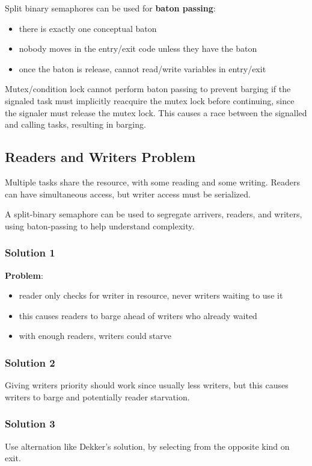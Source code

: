 \documentclass[11pt]{article}
\begin{document}
Split binary semaphores can be used for \textbf{baton passing}:
\begin{itemize}
\item there is exactly one conceptual baton
\item nobody moves in the entry/exit code unless they have the baton
\item once the baton is release, cannot read/write variables in entry/exit
\end{itemize}

Mutex/condition lock cannot perform baton passing to prevent barging if the signaled task
must implicitly reacquire the mutex lock before continuing, since the signaler must release
the mutex lock.
This causes a race between the signalled and calling tasks, resulting in barging.
\subsection{Readers and Writers Problem}
\label{sec:org2b49320}
Multiple tasks share the resource, with some reading and some writing.
Readers can have simultaneous access, but writer access must be serialized.

A split-binary semaphore can be used to segregate arrivers, readers, and writers,
using baton-passing to help understand complexity.
\subsubsection{Solution 1}
\label{sec:org819675a}
\textbf{Problem}:
\begin{itemize}
\item reader only checks for writer in resource, never writers waiting to use it
\item this causes readers to barge ahead of writers who already waited
\item with enough readers, writers could starve
\end{itemize}
\subsubsection{Solution 2}
\label{sec:org7963ca3}
Giving writers priority should work since usually less writers, but this causes
writers to barge and potentially reader starvation.
\subsubsection{Solution 3}
\label{sec:orga231821}
Use alternation like Dekker's solution, by selecting from the opposite kind on
exit.
\end{document}
